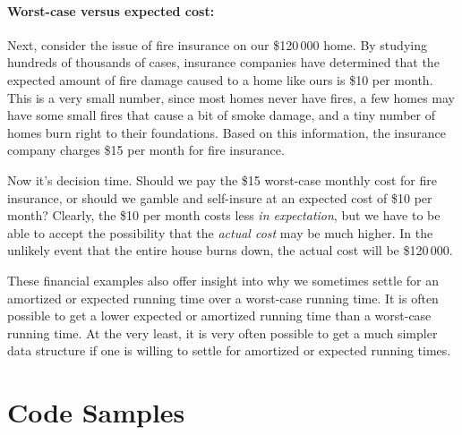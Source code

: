 {{{{{{{{{\paragraph{Worst-case versus expected cost:}
 Next, consider the issue of fire insurance on our \$120\,000 home.  By studying hundreds of thousands of cases, insurance companies have determined that the expected amount of fire damage caused to a home like ours is \$10 per month.  This is a very small number, since most homes never have fires, a few homes may have some small fires that cause a bit of smoke damage, and a tiny number of homes burn right to their foundations.  Based on this information, the insurance company charges \$15 per month for fire insurance.

Now it's decision time. Should we pay the \$15 worst-case monthly cost for fire insurance, or should we gamble and self-insure at an expected cost of \$10 per month?  Clearly, the \$10 per month costs less \emph{in expectation}, but we have to be able to accept the possibility that the \emph{actual cost} may be much higher.  In the unlikely event that the entire house burns down, the actual cost will be \$120\,000.

These financial examples also offer insight into why we sometimes settle for an amortized or expected running time over a worst-case running time.  It is often possible to get a lower expected or amortized running time than a worst-case running time. At the very least, it is very often possible to get a much simpler data structure if one is willing to settle for amortized or expected running times.

\section{Code Samples}

}}}}}}}}}
